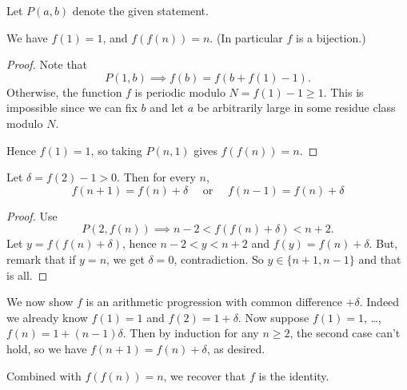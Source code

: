\documentclass[11pt]{scrartcl}
\begin{document}
Let $P(a,b)$ denote the given statement.

\begin{claim*}
  We have $f(1) = 1$, and $f(f(n)) = n$.
  (In particular $f$ is a bijection.)
\end{claim*}
\begin{proof}
  Note that \[ P(1,b) \implies f(b) = f(b+f(1)-1). \]
  Otherwise, the function $f$ is periodic modulo $N = f(1)-1 \ge 1$.
  This is impossible since we can fix $b$ and let $a$ be arbitrarily
  large in some residue class modulo $N$.

  Hence $f(1)=1$, so taking $P(n,1)$ gives $f(f(n)) = n$.
\end{proof}

\begin{claim*}
  Let $\delta = f(2)-1 > 0$.
  Then for every $n$,
  \[ f(n+1) = f(n) + \delta
    \quad\text{ or }\quad f(n-1) = f(n) + \delta \]
\end{claim*}
\begin{proof}
  Use
  \[ P(2, f(n)) \implies n-2 < f( f(n) + \delta ) < n+2. \]
  Let $y = f(f(n)+\delta)$, hence $n-2 < y < n+2$
  and $f(y) = f(n)+\delta$.
  But, remark that if $y = n$, we get $\delta = 0$, contradiction.
  So $y \in \{n+1, n-1\}$ and that is all.
\end{proof}

We now show $f$ is an arithmetic progression
with common difference $+\delta$.
Indeed we already know $f(1) = 1$ and $f(2) = 1+\delta$.
Now suppose $f(1)=1$, \dots, $f(n) = 1 + (n-1)\delta$.
Then by induction for any $n \ge 2$,
the second case can't hold,
so we have $f(n+1) = f(n)+\delta$, as desired.

Combined with $f(f(n)) = n$, we recover that $f$ is the identity.
\pagebreak
\end{document}
